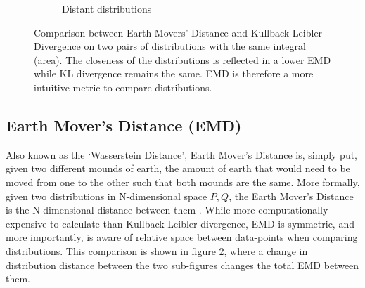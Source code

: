 \begin{figure}[h!]
\begin{subfigure}{.5\textwidth}
        \caption{Distant distributions}
        \label{fig:fardist}
    \end{subfigure}
    \caption[Comparison between Earth Mover Distance and Kullback-Leibler Divergence]{Comparison between Earth Movers' Distance and Kullback-Leibler Divergence on two pairs of distributions with the same integral (area). The closeness of the distributions is reflected in a lower EMD while KL divergence remains the same. EMD is therefore a more intuitive metric to compare distributions.}
    \label{fig:distributioncompKLEMD}
\end{figure}

\FloatBarrier

\subsection{Earth Mover's Distance (EMD)}

Also known as the `Wasserstein Distance', Earth Mover's Distance is, simply put,
given two different mounds of earth, the amount of earth that would need to be
moved from one to the other such that both mounds are the same. More formally,
given two distributions in N-dimensional space $P, Q$, the Earth Mover's
Distance is the N-dimensional distance between them \autocite{pele_fast_2009}. While more computationally
expensive to calculate than Kullback-Leibler divergence, EMD is symmetric, and
more importantly, is aware of relative space between data-points when comparing
distributions. This comparison is shown in figure
\ref{fig:distributioncompKLEMD}, where a change in distribution distance between
the two sub-figures changes the total EMD between them.